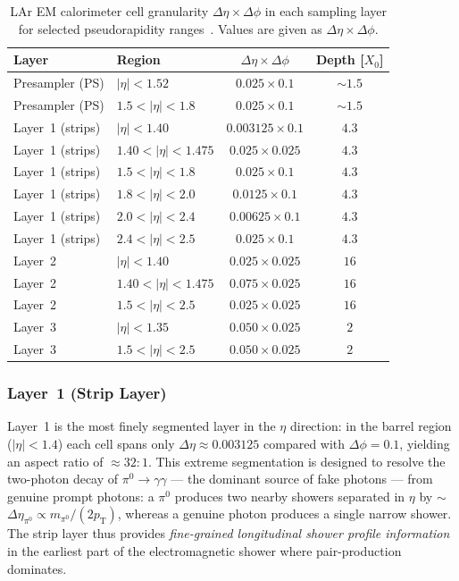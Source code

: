 \documentclass[11pt,a4paper]{article}
\newcommand{\abseta}{|\eta|}
\begin{document}
\begin{table}[htbp]
  \centering
  \caption{LAr EM calorimeter cell granularity
           $\Delta\eta \times \Delta\phi$ in each sampling layer
           for selected pseudorapidity ranges~\cite{ATLAS:2008}.
           Values are given as $\Delta\eta \times \Delta\phi$.}
  \label{tab:granularity}
  \begin{tabular}{llcc}
    \toprule
    Layer & Region & $\Delta\eta \times \Delta\phi$ & Depth [$X_0$] \\
    \midrule
    Presampler (PS) & $\abseta < 1.52$ & $0.025 \times 0.1$ & $\sim 1.5$ \\
    Presampler (PS) & $1.5 < \abseta < 1.8$ & $0.025 \times 0.1$ & $\sim 1.5$ \\
    \midrule
    Layer~1 (strips) & $\abseta < 1.40$ & $0.003125 \times 0.1$ & $4.3$ \\
    Layer~1 (strips) & $1.40 < \abseta < 1.475$ & $0.025 \times 0.025$ & $4.3$ \\
    Layer~1 (strips) & $1.5 < \abseta < 1.8$ & $0.025 \times 0.1$ & $4.3$ \\
    Layer~1 (strips) & $1.8 < \abseta < 2.0$ & $0.0125 \times 0.1$ & $4.3$ \\
    Layer~1 (strips) & $2.0 < \abseta < 2.4$ & $0.00625 \times 0.1$ & $4.3$ \\
    Layer~1 (strips) & $2.4 < \abseta < 2.5$ & $0.025 \times 0.1$ & $4.3$ \\
    \midrule
    Layer~2 & $\abseta < 1.40$ & $0.025 \times 0.025$ & $16$ \\
    Layer~2 & $1.40 < \abseta < 1.475$ & $0.075 \times 0.025$ & $16$ \\
    Layer~2 & $1.5 < \abseta < 2.5$ & $0.025 \times 0.025$ & $16$ \\
    \midrule
    Layer~3 & $\abseta < 1.35$ & $0.050 \times 0.025$ & $2$ \\
    Layer~3 & $1.5 < \abseta < 2.5$ & $0.050 \times 0.025$ & $2$ \\
    \bottomrule
  \end{tabular}
\end{table}

\subsubsection{Layer~1 (Strip Layer)}
\label{sec:atlas:layer1}

Layer~1 is the most finely segmented layer in the $\eta$ direction:
in the barrel region ($\abseta < 1.4$) each cell spans only
$\Delta\eta \approx 0.003125$ compared with $\Delta\phi = 0.1$,
yielding an aspect ratio of $\approx 32{:}1$.  This extreme
segmentation is designed to resolve the two-photon decay of
$\pi^0 \to \gamma\gamma$ — the dominant source of fake photons — from
genuine prompt photons: a $\pi^0$ produces two nearby showers
separated in $\eta$ by $\sim$$\Delta\eta_{\pi^0} \propto
m_{\pi^0}/(2p_\mathrm{T})$, whereas a genuine photon produces a
single narrow shower.  The strip layer thus provides
\emph{fine-grained longitudinal shower profile information} in the
earliest part of the electromagnetic shower where pair-production
dominates.
\end{document}
